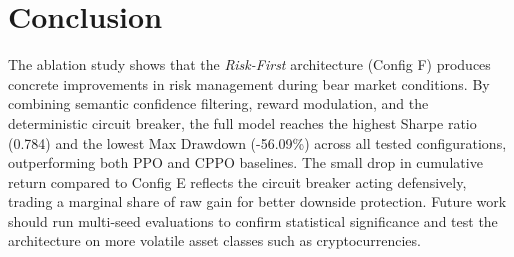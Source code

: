 \documentclass{article}
\begin{document}
\section{Conclusion}

The ablation study shows that the \textit{Risk-First} architecture (Config F) produces concrete improvements in risk management during bear market conditions. By combining semantic confidence filtering, reward modulation, and the deterministic circuit breaker, the full model reaches the highest Sharpe ratio (0.784) and the lowest Max Drawdown (-56.09\%) across all tested configurations, outperforming both PPO and CPPO baselines. The small drop in cumulative return compared to Config E reflects the circuit breaker acting defensively, trading a marginal share of raw gain for better downside protection. Future work should run multi-seed evaluations to confirm statistical significance and test the architecture on more volatile asset classes such as cryptocurrencies.



\end{document}
